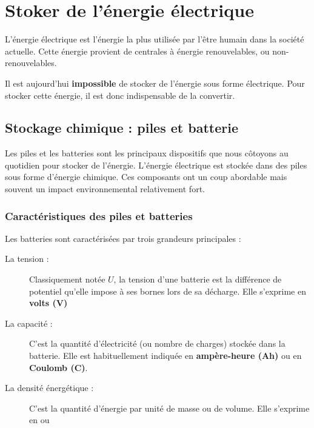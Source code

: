 \documentclass[10pt,fleqn]{article} %
\begin{document}
\section{Stoker de l'énergie électrique}
L'énergie électrique est l'énergie la plus utilisée par l'être humain dans la société actuelle. Cette énergie provient de centrales à énergie renouvelables, ou non-renouvelables.

Il est aujourd'hui \textbf{impossible} de stocker de l'énergie sous forme électrique. Pour stocker cette énergie, il est donc indispensable de la convertir.

\subsection{Stockage chimique : piles et batterie}
Les piles et les batteries sont les principaux dispositifs que nous côtoyons au quotidien pour stocker de l'énergie.
L'énergie électrique est stockée dans des piles sous forme d'énergie chimique. Ces composants ont un coup abordable mais souvent un impact environnemental relativement fort.

\subsubsection{Caractéristiques des piles et batteries}
Les batteries sont caractérisées par trois grandeurs principales :
\begin{description}
    \item[La tension :] Classiquement notée $U$, la tension d'une batterie est la différence de potentiel qu'elle impose à ses bornes lors de sa décharge. Elle s'exprime en \textbf{volts (V)}

    \item[La capacité : ] C'est la quantité d'électricité (ou nombre de charges) stockée dans la batterie. Elle est habituellement indiquée en \textbf{ampère-heure (Ah)} ou en \textbf{Coulomb (C)}.

    \item[La densité énergétique : ]C'est la quantité d'énergie par unité de masse ou de volume. Elle s'exprime en \si{} ou \si{}

\end{description}
\end{document}
